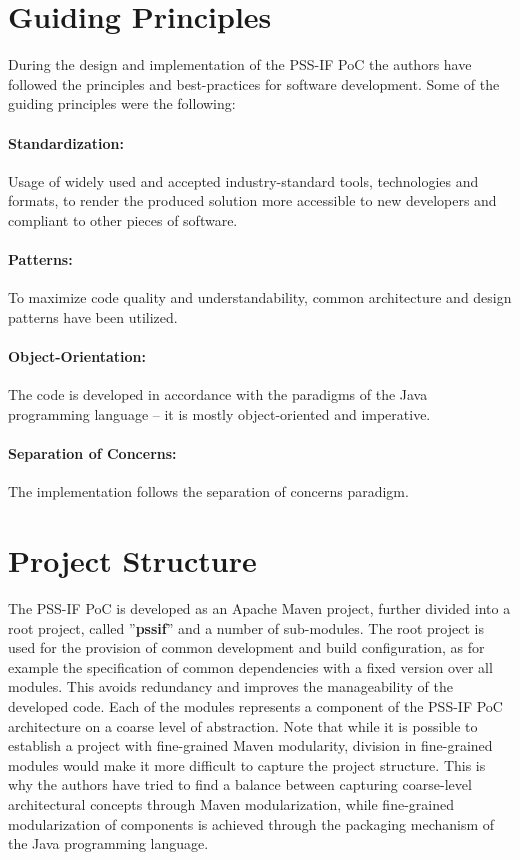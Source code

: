 \section{Guiding Principles}
\label{sec:impl:principles}

During the design and implementation of the PSS-IF PoC the authors have followed the principles and best-practices for software development. Some of the guiding principles were the following:

\paragraph{Standardization:} Usage of widely used and accepted industry-standard tools, technologies and formats, to render the produced solution more accessible to new developers and compliant to other pieces of software.

\paragraph{Patterns:} To maximize code quality and understandability, common architecture and design patterns have been utilized.

\paragraph{Object-Orientation:} The code is developed in accordance with the paradigms of the Java programming language -- it is mostly object-oriented and imperative.

\paragraph{Separation of Concerns:} The implementation follows the separation of concerns paradigm.

\section{Project Structure}
\label{sec:impl:structure}

The PSS-IF PoC is developed as an Apache Maven project, further divided into a root project, called ''\textbf{pssif}'' and a number of sub-modules. The root project is used for the provision of common development and  build configuration, as for example the specification of common dependencies with a fixed version over all modules. This avoids redundancy and improves the manageability of the developed code. Each of the modules represents a component of the PSS-IF PoC architecture on a coarse level of abstraction. Note that while it is possible to establish a project with fine-grained Maven modularity, division in fine-grained modules would make it more difficult to capture the project structure. This is why the authors have tried to find a balance between capturing coarse-level architectural concepts through Maven modularization, while fine-grained modularization of components is achieved through the packaging mechanism of the Java programming language.

